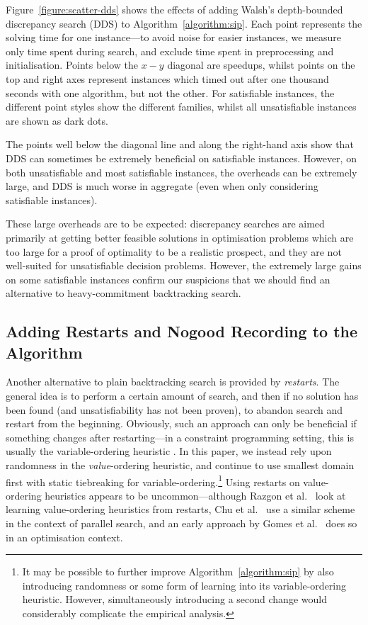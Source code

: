 \documentclass[a4paper,UKenglish]{lipics-v2018}
\newcommand{\Figureref}[1]{Figure~\ref{#1}}
\newcommand{\algorithmref}[1]{Algorithm~\ref{#1}}
\begin{document}
\Figureref{figure:scatter-dds} shows the effects of adding Walsh's \cite{DBLP:conf/ijcai/Walsh97}
depth-bounded discrepancy search (DDS) to \algorithmref{algorithm:sip}. Each point represents the solving
time for one instance---to avoid noise for easier instances, we measure only time spent during
search, and exclude time spent in preprocessing and initialisation.  Points below the $x-y$ diagonal
are speedups, whilst points on the top and right axes represent instances which timed out after one
thousand seconds with one algorithm, but not the other. For satisfiable instances, the different
point styles show the different families, whilst all unsatisfiable instances are shown as dark dots.

The points well below the diagonal line and along the right-hand axis show that DDS can sometimes be
extremely beneficial on satisfiable instances.  However, on both unsatisfiable and most satisfiable
instances, the overheads can be extremely large, and DDS is much worse in aggregate (even when only
considering satisfiable instances).

These large overheads are to be expected: discrepancy searches are aimed primarily at getting better
feasible solutions in optimisation problems which are too large for a proof of optimality to be a
realistic prospect, and they are not well-suited for unsatisfiable decision problems. However, the
extremely large gains on some satisfiable instances confirm our suspicions that we should find an
alternative to heavy-commitment backtracking search.

\subsection{Adding Restarts and Nogood Recording to the Algorithm}

Another alternative to plain backtracking search is provided by \emph{restarts}. The general idea is
to perform a certain amount of search, and then if no solution has been found (and unsatisfiability
has not been proven), to abandon search and restart from the beginning. Obviously, such an approach
can only be beneficial if something changes after restarting---in a constraint programming setting,
this is usually the variable-ordering heuristic
\cite{DBLP:journals/jsat/LecoutreSTV07,DBLP:conf/cp/GayHLS15,DBLP:conf/aaai/LeeSZ16,DBLP:conf/cp/GlorianBLLM17}.
In this paper, we instead rely upon randomness in the \emph{value}-ordering heuristic, and continue
to use smallest domain first with static tiebreaking for variable-ordering.\footnote{It may be
possible to further improve \algorithmref{algorithm:sip} by also introducing randomness or some form of
learning into its variable-ordering heuristic. However, simultaneously introducing a second change
would considerably complicate the empirical analysis.} Using restarts on value-ordering heuristics
appears to be uncommon---although Razgon et al.\ \cite{DBLP:conf/flairs/RazgonOP07} look at learning
value-ordering heuristics from restarts, Chu et al.\ \cite{DBLP:conf/cp/ChuSS09} use a similar
scheme in the context of parallel search, and an early approach by Gomes et
al.\ \cite{DBLP:conf/aaai/GomesSK98} does so in an optimisation context.
\end{document}
